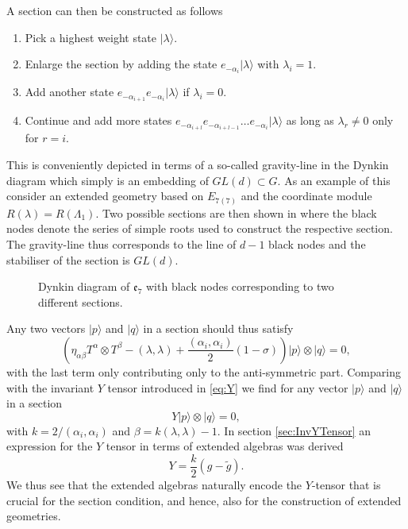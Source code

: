 A section can then be constructed as follows 
\begin{enumerate}
    \item Pick a highest weight state $|\lambda\rangle$.
    \item Enlarge the section by adding the state $e_{-\alpha_i}|\lambda\rangle$ with $\lambda_i=1$.
    \item Add another state $e_{-\alpha_{i+1}}e_{-\alpha_{i}}|\lambda\rangle$ if $\lambda_i=0$. 
    \item Continue and add more states $e_{-\alpha_{i+l}}e_{-\alpha_{i+l-1}}\ldots e_{-\alpha_{i}}|\lambda\rangle$ as long as $\lambda_{r}\neq 0$ only for $r=i$.
\end{enumerate}
This is conveniently depicted in terms of a so-called gravity-line in the Dynkin diagram which simply is an embedding of $GL(d)\subset G$. As an example of this consider an extended geometry based on $E_{7(7)}$ and the coordinate module $R(\lambda)=R(\Lambda_1)$. Two possible sections are then shown in  where the black nodes denote the series of simple roots used to construct the respective section. The gravity-line thus corresponds to the line of $d-1$ black nodes and the stabiliser of the section is $GL(d)$. 

\begin{figure}
    \caption{Dynkin diagram of $\mathfrak{e}_7$ with black nodes corresponding to two different sections.}
    \label{fig:E7WithSection}
\end{figure}

Any two vectors $|p\rangle$ and $|q\rangle$ in a section should thus satisfy 
\begin{equation}
    \left(\eta_{\alpha\beta}T^\alpha\otimes T^\beta-(\lambda,\lambda)+\frac{(\alpha_i,\alpha_i)}{2}(1-\sigma)\right)|p\rangle\otimes|q\rangle = 0,
\end{equation}
with the last term only contributing only to the anti-symmetric part. Comparing with the invariant $Y$ tensor introduced in \eqref{eq:Y} we find for any vector $|p\rangle$ and $|q\rangle$ in a section 
\begin{equation}
    Y|p\rangle\otimes|q\rangle = 0,
\end{equation}
with $k=2/(\alpha_i,\alpha_i)$ and $\beta=k(\lambda,\lambda)-1$. In section \ref{sec:InvYTensor} an expression for the $Y$ tensor in terms of extended algebras was derived  
\begin{equation}
    Y = \frac{k}{2}(g-\tilde{g}).
\end{equation}
We thus see that the extended algebras naturally encode the $Y$-tensor that is crucial for the section condition, and hence, also for the construction of extended geometries. 

